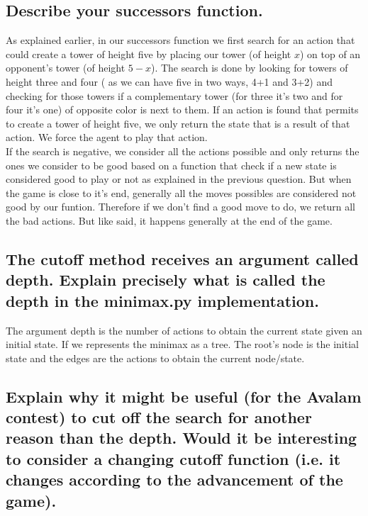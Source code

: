 \documentclass[10pt,a4paper]{article}
\begin{document}
\subsection{Describe your successors function.}

As explained earlier, in our successors function we first search for an action that could create a tower of height five by placing our tower (of height $x$) on top of an opponent's tower (of height $5-x$). The search is done by looking for towers of height three and four ( as we can have five in two ways, 4+1 and 3+2) and checking for those towers if a complementary tower (for three it's two and for four it's one) of opposite color is next to them. If an action is found that permits to create a tower of height five, we only return the state that is a result of that action. We force the agent to play that action.\\

If the search is negative, we consider all the actions possible and only returns the ones we consider to be good based on a function that check if a new state is considered good to play or not as explained in the previous question. But when the game is close to it's end, generally all the moves possibles are considered not good by our funtion. Therefore if we don't find a good move to do, we return all the bad actions. But like said, it happens generally at the end of the game.


\subsection{The cutoff method receives an argument called depth. Explain precisely what is called the depth in the minimax.py implementation.}

The argument depth is the number of actions to obtain the current state given an initial state. If we represents the minimax as a tree. The root's node is the initial state and the edges are the actions to obtain the current node/state.

\subsection{Explain why it might be useful (for the Avalam contest) to cut off the search for another reason than the depth. Would it be interesting to consider a changing cutoff function (i.e. it changes according to the advancement of the game).}
\end{document}
